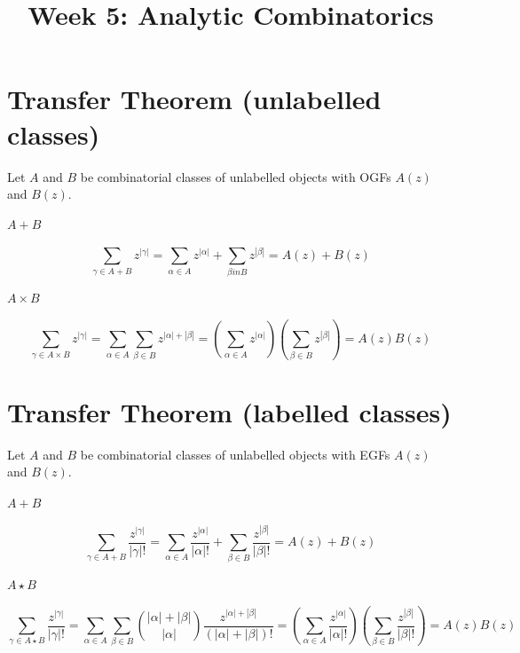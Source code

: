 \documentclass{article}
\begin{document}
\title{Week 5: Analytic Combinatorics}
\maketitle

\section{Transfer Theorem (unlabelled classes)}

Let $A$ and $B$ be combinatorial classes of unlabelled objects with OGFs $A(z)$
and $B(z)$.

\paragraph{$A + B$} \begin{equation*}
  \sum_{\gamma \in A + B} z^{|\gamma|} = \sum_{\alpha \in A} z^{|\alpha|} +
    \sum_{\beta in B} z^{|\beta|} = A(z) + B(z)
\end{equation*}

\paragraph{$A \times B$} \begin{equation*}
  \sum_{\gamma \in A \times B} z^{|\gamma|}
    = \sum_{\alpha \in A} \sum_{\beta \in B} z^{|\alpha| + |\beta|}
    = \left(\sum_{\alpha \in A} z^{|\alpha|}\right)
      \left(\sum_{\beta \in B} z^{|\beta|}\right)
    = A(z)B(z)
\end{equation*}

\section{Transfer Theorem (labelled classes)}

Let $A$ and $B$ be combinatorial classes of unlabelled objects with EGFs $A(z)$
and $B(z)$.

\paragraph{$A + B$} \begin{equation*}
  \sum_{\gamma \in A + B} \frac{z^{|\gamma|}}{|\gamma|!}
  = \sum_{\alpha \in A} \frac{z^{|\alpha|}}{|\alpha|!}
  + \sum_{\beta \in B} \frac{z^{|\beta|}}{|\beta|!}
  = A(z) + B(z)
\end{equation*}

\paragraph{$A \star B$} \begin{equation*}
  \sum_{\gamma \in A \star B} \frac{z^{|\gamma|}}{|\gamma|!}
  = \sum_{\alpha \in A} \sum_{\beta \in B} \binom{|\alpha| + |\beta|}{|\alpha|}
    \frac{z^{|\alpha| + |\beta|}}{(|\alpha| + |\beta|)!}
  = \left(\sum_{\alpha \in A} \frac{z^{|\alpha|}}{|\alpha|!}\right)
\left(\sum_{\beta \in B} \frac{z^{|\beta|}}{|\beta|!}\right)
  = A(z)B(z)
\end{equation*}
\end{document}
